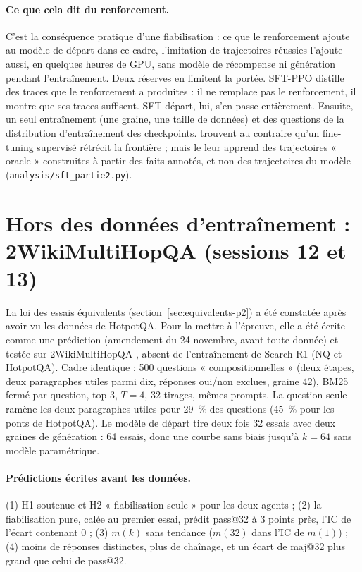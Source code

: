 \documentclass[11pt,a4paper]{article}
\begin{document}
\paragraph{Ce que cela dit du renforcement.} C'est la conséquence pratique d'une fiabilisation : ce que le renforcement ajoute au modèle de départ dans ce cadre, l'imitation de trajectoires réussies l'ajoute aussi, en quelques heures de GPU, sans modèle de récompense ni génération pendant l'entraînement. Deux réserves en limitent la portée. SFT-PPO distille des traces que le renforcement a produites : il ne remplace pas le renforcement, il montre que ses traces suffisent. SFT-départ, lui, s'en passe entièrement. Ensuite, un seul entraînement (une graine, une taille de données) et des questions de la distribution d'entraînement des checkpoints. \citet{zhai2026does} trouvent au contraire qu'un fine-tuning supervisé rétrécit la frontière ; mais le leur apprend des trajectoires « oracle » construites à partir des faits annotés, et non des trajectoires du modèle (\texttt{analysis/sft\_partie2.py}).

\section{Hors des données d'entraînement : 2WikiMultiHopQA (sessions 12 et 13)}\label{sec:2wiki-p2}

La loi des essais équivalents (section~\ref{sec:equivalents-p2}) a été constatée après avoir vu les données de HotpotQA. Pour la mettre à l'épreuve, elle a été écrite comme une prédiction (amendement du 24 novembre, avant toute donnée) et testée sur 2WikiMultiHopQA \citep{ho2020constructing}, absent de l'entraînement de Search-R1 (NQ et HotpotQA). Cadre identique : 500 questions « compositionnelles » (deux étapes, deux paragraphes utiles parmi dix, réponses oui/non exclues, graine 42), BM25 fermé par question, top 3, $T = 4$, 32 tirages, mêmes prompts. La question seule ramène les deux paragraphes utiles pour 29~\% des questions (45~\% pour les ponts de HotpotQA). Le modèle de départ tire deux fois 32 essais avec deux graines de génération : 64 essais, donc une courbe sans biais jusqu'à $k = 64$ sans modèle paramétrique.

\paragraph{Prédictions écrites avant les données.} (1) H1 soutenue et H2 « fiabilisation seule » pour les deux agents ; (2) la fiabilisation pure, calée au premier essai, prédit pass@32 à 3 points près, l'IC de l'écart contenant 0 ; (3) $m(k)$ sans tendance ($m(32)$ dans l'IC de $m(1)$) ; (4) moins de réponses distinctes, plus de chaînage, et un écart de maj@32 plus grand que celui de pass@32.
\end{document}
